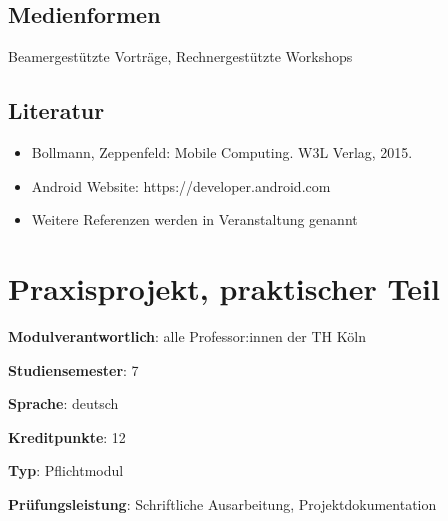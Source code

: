 \hypertarget{medienformenpathlabel....srcmodulbeschreibungen-bachelor-bpo5ba_mobile-computing}{%
\section*{Medienformen\label{../../src/modulbeschreibungen-bachelor-bpo5/BA_Mobile-Computing}}\label{medienformenpathlabel....srcmodulbeschreibungen-bachelor-bpo5ba_mobile-computing}}

Beamergestützte Vorträge, Rechnergestützte Workshops

\hypertarget{literaturpathlabel....srcmodulbeschreibungen-bachelor-bpo5ba_mobile-computing}{%
\section*{Literatur\label{../../src/modulbeschreibungen-bachelor-bpo5/BA_Mobile-Computing}}\label{literaturpathlabel....srcmodulbeschreibungen-bachelor-bpo5ba_mobile-computing}}

\begin{itemize}
\tightlist
\item
  Bollmann, Zeppenfeld: Mobile Computing. W3L Verlag, 2015.
\item
  Android Website: https://developer.android.com
\item
  Weitere Referenzen werden in Veranstaltung genannt
\end{itemize}

\hypertarget{praxisprojekt-praktischer-teilpathlabel....srcmodulbeschreibungen-bachelor-bpo5BA_Praxisprojekt}{%
\chapter{Praxisprojekt, praktischer
Teil\label{../../src/modulbeschreibungen-bachelor-bpo5/BA_Praxisprojekt}}\label{praxisprojekt-praktischer-teilpathlabel....srcmodulbeschreibungen-bachelor-bpo5BA_Praxisprojekt}}

\begin{modulHead}
\textbf{Modulverantwortlich}: alle Professor:innen
der TH Köln
\end{modulHead}
\begin{modulHead}
\textbf{Studiensemester}:
7
\end{modulHead}
\begin{modulHead}
\textbf{Sprache}:
deutsch
\end{modulHead}
\begin{modulHead}
\textbf{Kreditpunkte}:
12
\end{modulHead}
\begin{modulHead}
\textbf{Typ}:
Pflichtmodul
\end{modulHead}
\begin{modulHead}
\textbf{Prüfungsleistung}:
Schriftliche Ausarbeitung, Projektdokumentation
\end{modulHead}


